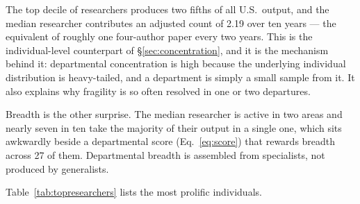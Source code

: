 \documentclass[11pt]{article}
\begin{document}
The top decile of researchers produces two fifths of all U.S.\ output, and the
median researcher contributes an adjusted count of 2.19 over ten years --- the
equivalent of roughly one four-author paper every two years. This is the
individual-level counterpart of \S\ref{sec:concentration}, and it is the
mechanism behind it: departmental concentration is high because the underlying
individual distribution is heavy-tailed, and a department is simply a small
sample from it. It also explains why fragility is so often resolved in one or
two departures.

Breadth is the other surprise. The median researcher is active in two areas and
nearly seven in ten take the majority of their output in a single one, which
sits awkwardly beside a departmental score (Eq.~\ref{eq:score}) that rewards
breadth across 27 of them. Departmental breadth is assembled from specialists,
not produced by generalists.

Table~\ref{tab:topresearchers} lists the most prolific individuals.
\end{document}
